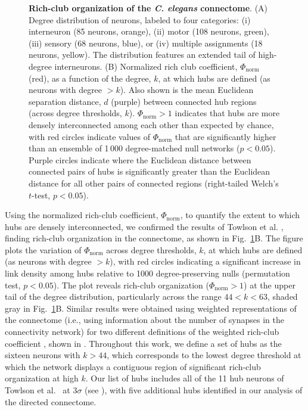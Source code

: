 \documentclass[10pt,letterpaper]{article}
\begin{document}
\begin{figure}[h]
   \centering
 \caption{\textbf{Rich-club organization of the \emph{C. elegans} connectome}.
(A) Degree distribution of neurons, labeled to four categories:
(i) interneuron (85 neurons, orange),
(ii) motor (108 neurons, green),
(iii) sensory (68 neurons, blue), or
(iv) multiple assignments (18 neurons, yellow).
The distribution features an extended tail of high-degree interneurons.
(B)
Normalized rich club coefficient, $\Phi_\mathrm{norm}$ (red), as a function of the degree, $k$, at which hubs are defined (as neurons with degree $>k$).
Also shown is the mean Euclidean separation distance, $d$ (purple) between connected hub regions (across degree thresholds, $k$).
$\Phi_\mathrm{norm} > 1$ indicates that hubs are more densely interconnected among each other than expected by chance, with red circles indicate values of $\Phi_\mathrm{norm}$ that are significantly higher than an ensemble of 1\,000 degree-matched null networks ($p < 0.05$).
Purple circles indicate where the Euclidean distance between connected pairs of hubs is significantly greater than the Euclidean distance for all other pairs of connected regions (right-tailed Welch's $t$-test, $p < 0.05$).
}
 \label{fig:Fig5}
 \end{figure}
 
Using the normalized rich-club coefficient, $\Phi_\mathrm{norm}$, to quantify the extent to which hubs are densely interconnected, we confirmed the results of Towlson et al. \cite{Towlson2013}, finding rich-club organization in the connectome, as shown in Fig.~\ref{fig:Fig5}B.
The figure plots the variation of $\Phi_\mathrm{norm}$ across degree thresholds, $k$, at which hubs are defined (as neurons with degree $>k$), with red circles indicating a significant increase in link density among hubs relative to 1000 degree-preserving nulls (permutation test, $p < 0.05$).
The plot reveals rich-club organization ($\Phi_\mathrm{norm} > 1$) at the upper tail of the degree distribution, particularly across the range $44 < k < 63$, shaded gray in Fig.~\ref{fig:Fig5}B.
Similar results were obtained using weighted representations of the connectome (i.e., using information about the number of synapses in the connectivity network) for two different definitions of the weighted rich-club coefficient \cite{Opsahl2008}, shown in .
Throughout this work, we define a set of hubs as the sixteen neurons with $k > 44$, which corresponds to the lowest degree threshold at which the network displays a contiguous region of significant rich-club organization at high $k$.
Our list of hubs includes all of the 11 hub neurons of Towlson et al.~\cite{Towlson2013} at $3 \sigma$ (see ), with five additional hubs identified in our analysis of the directed connectome.
\end{document}
